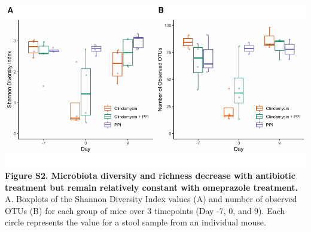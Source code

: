 \documentclass[11pt,]{article}
\begin{document}
\newpage

\includegraphics{figure_s2.pdf} \textbf{Figure S2. Microbiota diversity
and richness decrease with antibiotic treatment but remain relatively
constant with omeprazole treatment.} A. Boxplots of the Shannon
Diversity Index values (A) and number of observed OTUs (B) for each
group of mice over 3 timepoints (Day -7, 0, and 9). Each circle
represents the value for a stool sample from an individual mouse.
\end{document}
